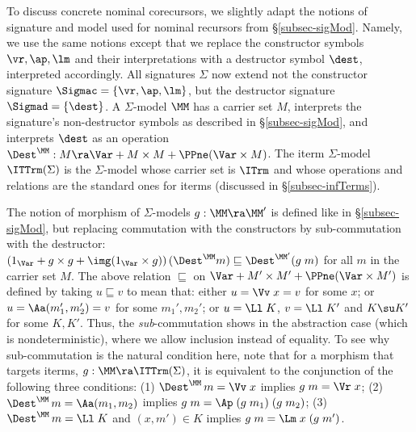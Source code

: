 To discuss concrete nominal corecursors, we slightly adapt the notions of signature and model 
used for nominal recursors from \S\ref{subsec-sigMod}. Namely, we use the same notions 
except that we replace the constructor symbols $\vr,\ap,\lm$ and their interpretations with 
a destructor symbol $\dest$, interpreted accordingly. 
All signatures $\Sigma$ now extend not the constructor signature $\Sigmac = \{\vr,\ap,\lm\}$, but the destructor signature 
$\Sigmad = \{\dest\}$. A $\Sigma$-model $\MM$ has a carrier set $M$,  interprets 
the signature's non-destructor symbols 
as described in \S\ref{subsec-sigMod}, and interprets $\dest$ as an operation 
$\Dest^\MM : M \ra \Var + M \times M + \PPne(\Var \times M)$. 
%
The iterm $\Sigma$-model $\ITTrm(\Sigma)$ is the $\Sigma$-model whose carrier set is  
$\ITrm$ 
and whose operations and relations are the standard ones for iterms (discussed in \S\ref{subsec-infTerms}). 

The notion of morphism of $\Sigma$-models $g : \MM \ra \MM'$ is defined like in \S\ref{subsec-sigMod}, but 
replacing commutation with the constructors by sub-commutation with the destructor:
$(1_\Var + g \times g + \img(1_\Var \times g))\,(\Dest^\MM m) \sqsubseteq \Dest^{\MM'}(g\;m) $ for all $m$ in the carrier set $M$. 
The above relation $\sqsubseteq$ on $\Var + M' \times M' + \PPne(\Var \times M')$ 
is defined by taking $u \sqsubseteq v$ to mean that: 
either $u=\Vv\;x = v$ for some $x$; 
or $u=\Aa(m_1',m_2') = v$ for some $m_1',m_2'$;
or $u=\Ll\;K$, $v=\Ll\;K'$ and $K \su K'$ for some $K,K'$. %
Thus, the \emph{sub}-commutation shows 
in the abstraction case (which is nondeterministic), where we allow inclusion instead of equality. 
%
%
%
To see why sub-commutation is the natural condition here,  
note that %
for a morphism that targets iterms, 
$g : \MM \ra \ITTrm(\Sigma)$, it is equivalent to the conjunction of the following three conditions:  %
(1) $\Dest^{\MM}\,m = \Vv\;x$ implies $g\;m = \Vr\;x$; 
(2) $\Dest^{\MM}\,m = \Aa (m_1,m_2)$ implies $g\;m = \Ap\;(g\;m_1)\;(g\;m_2)$; 
(3) $\Dest^{\MM}\,m = \Ll \;K$ and $(x,m')\in K$ implies $g\;m = \Lm\;x\;(g\;m')$. 

